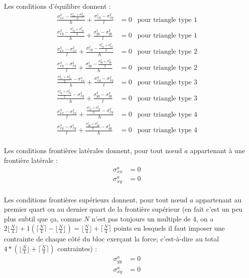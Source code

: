 Les conditions d'équilibre donnent : 
\begin{align*}
\frac{\sigma_{xx}^3 - \frac{\sigma_{xx}^1+\sigma_{xx}^2}{2}}{h} + \frac{\sigma_{xy}^1-\sigma_{xy}^2}{l}&=0 & \text{pour triangle type 1}\\
\frac{\sigma_{xy}^3 - \frac{\sigma_{xy}^1+\sigma_{xy}^2}{2}}{h} + \frac{\sigma_{yy}^1-\sigma_{yy}^2}{l}&=0& \text{pour triangle type 1}\\
\frac{\sigma_{xx}^3-\sigma_{xx}^2}{l} + \frac{\sigma_{xy}^1 - \frac{\sigma_{xy}^3+\sigma_{xy}^2}{2}}{h} &=0& \text{pour triangle type 2}\\
\frac{\sigma_{xy}^3-\sigma_{xy}^2}{l} + \frac{\sigma_{yy}^1 - \frac{\sigma_{yy}^3+\sigma_{yy}^2}{2}}{h} &=0 & \text{pour triangle type 2}\\
\frac{\frac{\sigma_{xx}^3+\sigma_{xx}^2}{2} - \sigma_{xx}^1 }{h} + \frac{\sigma_{xy}^3-\sigma_{xy}^2}{l}&=0& \text{pour triangle type 3}\\
\frac{\frac{\sigma_{xy}^3+\sigma_{xy}^2}{2} - \sigma_{xy}^1 }{h} + \frac{\sigma_{yy}^3-\sigma_{yy}^2}{l}&=0& \text{pour triangle type 3}\\
\frac{\sigma_{xx}^3-\sigma_{xx}^1}{l} + \frac{\frac{\sigma_{xy}^1+\sigma_{xy}^3}{2} - \sigma_{xy}^2 }{h} &=0 & \text{pour triangle type 4}\\
\frac{\sigma_{xy}^3-\sigma_{xy}^1}{l} + \frac{\frac{\sigma_{yy}^1+\sigma_{yy}^3}{2} - \sigma_{yy}^2 }{h} &=0 & \text{pour triangle type 4}\\
\end{align*}


Les conditions frontières latérales donnent, pour tout nœud $a$ appartenant à une frontière latérale : 
\begin{align*}
\sigma_{xx}^a&= 0\\
 \sigma_{xy}^a &= 0  \\
\end{align*}

Les conditions frontières supérieurs donnent, pour tout nœud $a$ appartenant au premier quart ou au dernier quart de la frontière supérieur (en fait c'est un peu plus subtil que ça, comme $N$ n'est pas toujours un multiple de 4, on a $2\lfloor \frac{N}{4} \rfloor + 1 \left( \lceil \frac{N}{4} \rceil - \lfloor \frac{N}{4} \rfloor \right) = \lfloor \frac{N}{4} \rfloor + \lceil \frac{N}{4} \rceil$ points en lesquels il faut imposer une contrainte de chaque côté du bloc exerçant la force; c'est-à-dire au total $4*\left(  \lfloor \frac{N}{4} \rfloor + \lceil \frac{N}{4} \rceil \right)$ contraintes) : 
\begin{align*}
\sigma_{yy}^a&= 0\\
 \sigma_{xy}^a &= 0  \\
\end{align*}


